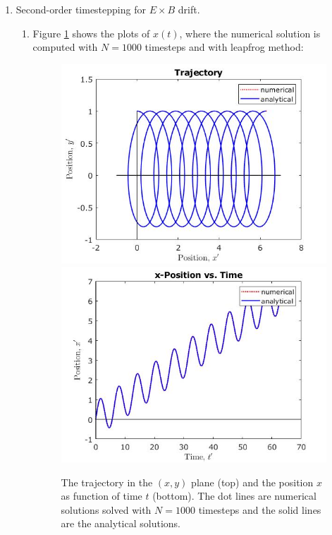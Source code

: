 \documentclass{article}
\begin{document}
\begin{enumerate}
\item Second-order timestepping for $E\times B$ drift.
\begin{enumerate}
\item
Figure \ref{problem 2b.1} shows the plots of $x(t)$, where the numerical solution is computed with $N=1000$ timesteps and with leapfrog method:
\begin{figure}[h]
\centering
\vbox{
\includegraphics[scale=0.6]{problem2b/trajectory_timestep_1000.jpg}
\includegraphics[scale=0.6]{problem2b/xposition_timestep_1000.jpg}
}
\caption{The trajectory in the $(x, y)$ plane (top) and the position $x$ as function of time $t$ (bottom). The dot lines are numerical solutions solved with $N=1000$ timesteps and the solid lines are the analytical solutions.}
\label{problem 2b.1}
\end{figure}


\end{enumerate}
\end{enumerate}
\end{document}
